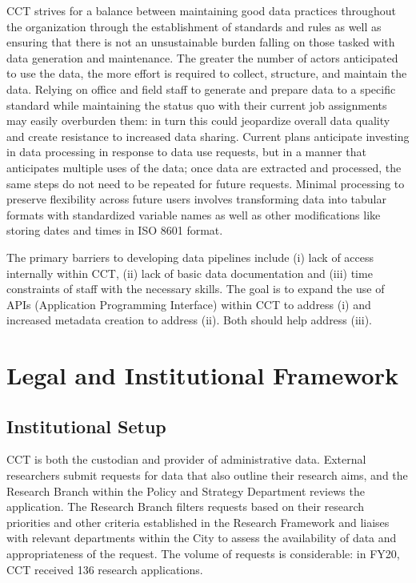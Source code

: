 \documentclass[
]{book}
\begin{document}
CCT strives for a balance between maintaining good data practices throughout the organization through the establishment of standards and rules as well as ensuring that there is not an unsustainable burden falling on those tasked with data generation and maintenance. The greater the number of actors anticipated to use the data, the more effort is required to collect, structure, and maintain the data. Relying on office and field staff to generate and prepare data to a specific standard while maintaining the status quo with their current job assignments may easily overburden them: in turn this could jeopardize overall data quality and create resistance to increased data sharing. Current plans anticipate investing in data processing in response to data use requests, but in a manner that anticipates multiple uses of the data; once data are extracted and processed, the same steps do not need to be repeated for future requests. Minimal processing to preserve flexibility across future users involves transforming data into tabular formats with standardized variable names as well as other modifications like storing dates and times in ISO 8601 format.

The primary barriers to developing data pipelines include (i) lack of access internally within CCT, (ii) lack of basic data documentation and (iii) time constraints of staff with the necessary skills. The goal is to expand the use of APIs (Application Programming Interface) within CCT to address (i) and increased metadata creation to address (ii). Both should help address (iii).

\hypertarget{legal-and-institutional-framework-6}{%
\section{Legal and Institutional Framework}\label{legal-and-institutional-framework-6}}

\hypertarget{institutional-setup-6}{%
\subsection{Institutional Setup}\label{institutional-setup-6}}

CCT is both the custodian and provider of administrative data. External researchers submit requests for data that also outline their research aims, and the Research Branch within the Policy and Strategy Department reviews the application. The Research Branch filters requests based on their research priorities and other criteria established in the Research Framework and liaises with relevant departments within the City to assess the availability of data and appropriateness of the request. The volume of requests is considerable: in FY20, CCT received 136 research applications.
\end{document}
